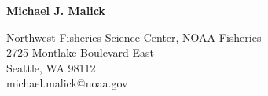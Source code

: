 \documentclass[11pt]{article}
\begin{document}
\thispagestyle{firststyle}

{\LARGE \textbf{Michael J. Malick}}
\vspace*{0.25cm}


Northwest Fisheries Science Center, NOAA Fisheries \\
2725 Montlake Boulevard East\\
Seattle, WA 98112 \\
michael.malick@noaa.gov


\vspace*{0.25cm}

\end{document}
